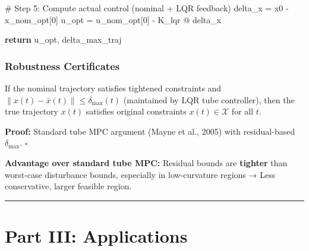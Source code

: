 \documentclass[
  letterpaper,
  DIV=11,
  numbers=noendperiod]{scrartcl}
\newenvironment{Shaded}{\begin{snugshade}}{\end{snugshade}}
\newcommand{\CommentTok}[1]{\textcolor[rgb]{0.37,0.37,0.37}{#1}}
\newcommand{\ControlFlowTok}[1]{\textcolor[rgb]{0.00,0.23,0.31}{\textbf{#1}}}
\newcommand{\DecValTok}[1]{\textcolor[rgb]{0.68,0.00,0.00}{#1}}
\newcommand{\NormalTok}[1]{\textcolor[rgb]{0.00,0.23,0.31}{#1}}
\newcommand{\OperatorTok}[1]{\textcolor[rgb]{0.37,0.37,0.37}{#1}}
\begin{document}
\begin{Shaded}
\begin{Highlighting}[]
    \CommentTok{\# Step 5: Compute actual control (nominal + LQR feedback)}
\NormalTok{    delta\_x }\OperatorTok{=}\NormalTok{ x0 }\OperatorTok{{-}}\NormalTok{ x\_nom\_opt[}\DecValTok{0}\NormalTok{]}
\NormalTok{    u\_opt }\OperatorTok{=}\NormalTok{ u\_nom\_opt[}\DecValTok{0}\NormalTok{] }\OperatorTok{{-}}\NormalTok{ K\_lqr }\OperatorTok{@}\NormalTok{ delta\_x}

    \ControlFlowTok{return}\NormalTok{ u\_opt, delta\_max\_traj}
\end{Highlighting}
\end{Shaded}

\subsubsection{Robustness Certificates}\label{robustness-certificates}

\begin{tcolorbox}[enhanced jigsaw, breakable, bottomtitle=1mm, title=\textcolor{quarto-callout-important-color}{\faExclamation}\hspace{0.5em}{Theorem 2.2: Constraint Satisfaction Guarantee}, opacityback=0, left=2mm, titlerule=0mm, colframe=quarto-callout-important-color-frame, opacitybacktitle=0.6, bottomrule=.15mm, toptitle=1mm, toprule=.15mm, arc=.35mm, leftrule=.75mm, rightrule=.15mm, colback=white, colbacktitle=quarto-callout-important-color!10!white, coltitle=black]

If the nominal trajectory satisfies tightened constraints and
\(\|x(t) - \bar{x}(t)\| \leq \delta_{\max}(t)\) (maintained by LQR tube
controller), then the true trajectory \(x(t)\) satisfies original
constraints \(x(t) \in \mathcal{X}\) for all \(t\).

\end{tcolorbox}

\textbf{Proof:} Standard tube MPC argument (Mayne et al., 2005) with
residual-based \(\delta_{\max}\). \(\square\)

\textbf{Advantage over standard tube MPC:} Residual bounds are
\textbf{tighter} than worst-case disturbance bounds, especially in
low-curvature regions → Less conservative, larger feasible region.

\begin{center}\rule{0.5\linewidth}{0.5pt}\end{center}

\section{Part III: Applications}\label{sec-applications}
\end{document}
